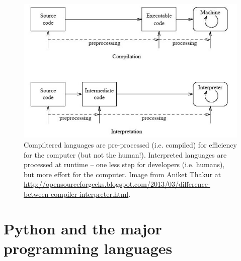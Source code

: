 \documentclass[a4paper,10pt]{scrartcl}
\begin{document}
\begin{figure}[h]
\begin{center}
\includegraphics[width=.8\linewidth]{figures/Introduction/Compilervrsinterpreter.JPG}
\end{center}
\caption{Compiltered languages are pre-processed (i.e. compiled) for efficiency for the computer (but not the human!). Interpreted languages are processed at runtime -- one less step for developers (i.e. humans), but more effort for the computer. Image from Aniket Thakur at \url{http://opensourceforgeeks.blogspot.com/2013/03/difference-between-compiler-interpreter.html}.}
\end{figure}

\section{Python and the major programming languages}
\end{document}
